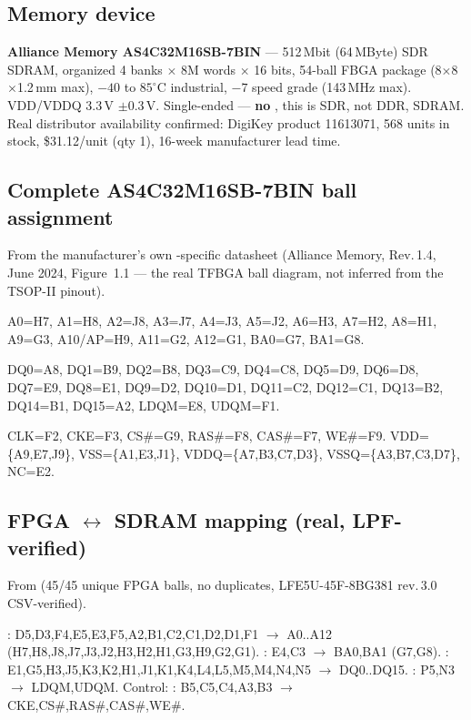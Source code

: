\subsection{Memory device}
\textbf{Alliance Memory AS4C32M16SB-7BIN} --- 512\,Mbit (64\,MByte) SDR
SDRAM, organized 4 banks $\times$ 8M words $\times$ 16 bits, 54-ball
FBGA package (8$\times$8$\times$1.2\,mm max), $-40$ to $85^{\circ}$C
industrial, $-7$ speed grade (143\,MHz max). VDD/VDDQ 3.3\,V $\pm$0.3\,V.
Single-ended  --- \textbf{no }, this is SDR, not
DDR, SDRAM. Real distributor availability confirmed: DigiKey product
11613071, 568 units in stock, \$31.12/unit (qty 1), 16-week
manufacturer lead time.

\subsection{Complete AS4C32M16SB-7BIN ball assignment}
From the manufacturer's own -specific datasheet (Alliance
Memory, Rev.\,1.4, June 2024, Figure~1.1 --- the real TFBGA ball
diagram, not inferred from the TSOP-II  pinout).

\begin{fnnote}
A0=H7, A1=H8, A2=J8, A3=J7, A4=J3, A5=J2, A6=H3, A7=H2, A8=H1, A9=G3,
A10/AP=H9, A11=G2, A12=G1, BA0=G7, BA1=G8.
\end{fnnote}
\begin{fnnote}
DQ0=A8, DQ1=B9, DQ2=B8, DQ3=C9, DQ4=C8, DQ5=D9, DQ6=D8, DQ7=E9, DQ8=E1,
DQ9=D2, DQ10=D1, DQ11=C2, DQ12=C1, DQ13=B2, DQ14=B1, DQ15=A2, LDQM=E8,
UDQM=F1.
\end{fnnote}
\begin{fnnote}
CLK=F2, CKE=F3, CS\#=G9, RAS\#=F8, CAS\#=F7, WE\#=F9. VDD=\{A9,E7,J9\},
VSS=\{A1,E3,J1\}, VDDQ=\{A7,B3,C7,D3\}, VSSQ=\{A3,B7,C3,D7\}, NC=E2.
\end{fnnote}

\subsection{FPGA $\leftrightarrow$ SDRAM mapping (real, LPF-verified)}
From  (45/45 unique
FPGA balls, no duplicates, LFE5U-45F-8BG381 rev.\,3.0 CSV-verified).

\begin{fnnote}
: D5,D3,F4,E5,E3,F5,A2,B1,C2,C1,D2,D1,F1 $\to$
A0..A12 (H7,H8,J8,J7,J3,J2,H3,H2,H1,G3,H9,G2,G1). :
E4,C3 $\to$ BA0,BA1 (G7,G8). :
E1,G5,H3,J5,K3,K2,H1,J1,K1,K4,L4,L5,M5,M4,N4,N5 $\to$ DQ0..DQ15.
: P5,N3 $\to$ LDQM,UDQM. Control:
: B5,C5,C4,A3,B3 $\to$
CKE,CS\#,RAS\#,CAS\#,WE\#.
\end{fnnote}

